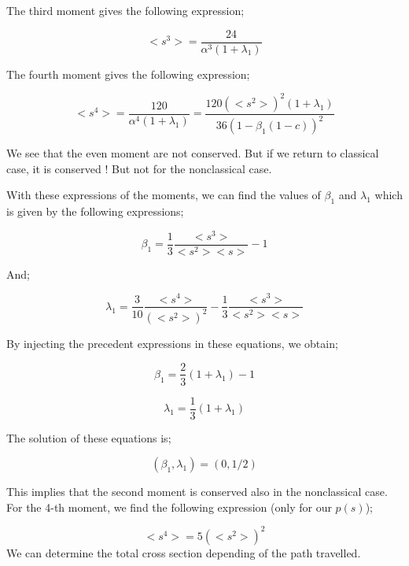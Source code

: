 \documentclass[preprint,12pt]{elsarticle}
\newcommand{\bl}{\big<}
\newcommand{\bg}{\big>}
\begin{document}
The third moment gives the following expression;

\begin{equation}
\bl s^3 \bg = \frac{24}{\alpha^3 (1+\lambda_1)} 
\end{equation}


The fourth moment gives the following expression;

\begin{equation}
\bl s^4 \bg = \frac{120}{\alpha^4 (1+\lambda_1)} = \frac{120 \left(\bl s^2 \bg\right)^2 (1+\lambda_1)}{36 (1-\beta_1(1-c))^2} 
\end{equation}

We see that the even moment are not conserved. But if we return to classical case, it is conserved ! But not for the nonclassical case.

With these expressions of the moments, we can find the values of $\beta_1$ and $\lambda_1$ which is given by the following expressions;

\begin{equation}
\beta_1 = \frac{1}{3} \frac{\bl s^3 \bg}{\bl s^2 \bg\bl s \bg} - 1
\end{equation}

And;

\begin{equation}
\lambda_1 = \frac{3}{10} \frac{\bl s^4 \bg}{\left(\bl s^2 \bg \right)^2} - \frac{1}{3} \frac{\bl s^3 \bg}{\bl s^2 \bg\bl s \bg}
\end{equation}

By injecting the precedent expressions in these equations, we obtain;

\begin{equation}
\beta_1 = \frac{2}{3}(1+\lambda_1) - 1
\end{equation}

\begin{equation}
\lambda_1 = \frac{1}{3}(1+\lambda_1) 
\end{equation}

The solution of these equations is;

\begin{equation}
(\beta_1,\lambda_1) = (0,1/2)
\end{equation}

This implies that the second moment is conserved also in the nonclassical case. For the 4-th moment, we find the following expression (only for our $p(s)$);

\begin{equation}
\bl s^4 \bg = 5 \left(\bl s^2 \bg \right)^2
\end{equation}
We can determine the total cross section depending of the path travelled.
\end{document}
